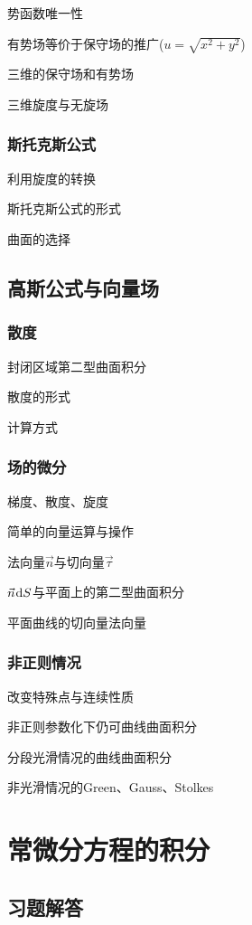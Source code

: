 \documentclass[a4paper,UTF8,fontset=windows,AutoFakeBold]{ctexart}
\newcommand*{\dr}{\hspace{0.07em}\mathrm{d}}
\newcommand*{\nv}{\vec{n}}
\theoremstyle{ex}
\begin{document}
势函数唯一性

有势场等价于保守场的推广($u=\sqrt{x^2+y^2}$)

三维的保守场和有势场

三维旋度与无旋场

\subsubsection{斯托克斯公式}
利用旋度的转换

斯托克斯公式的形式

曲面的选择

\subsection{高斯公式与向量场}
\subsubsection{散度}
封闭区域第二型曲面积分

散度的形式

计算方式

\subsubsection{场的微分}
梯度、散度、旋度

简单的向量运算与操作

法向量$\nv$与切向量$\vec{\tau}$

$\nv\dr S$与平面上的第二型曲面积分

平面曲线的切向量法向量

\subsubsection{非正则情况}
改变特殊点与连续性质

非正则参数化下仍可曲线曲面积分

分段光滑情况的曲线曲面积分

非光滑情况的Green、Gauss、Stolkes


\newpage
\section{常微分方程的积分}
\subsection{习题解答}
\end{document}
